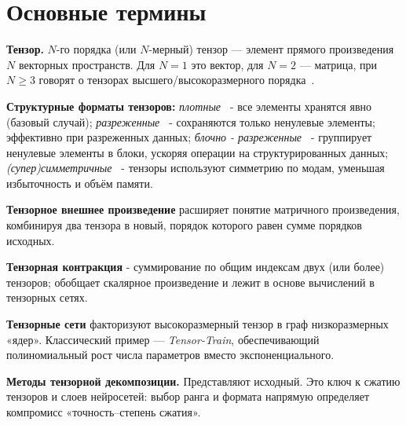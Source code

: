 \chapter{Основные термины}
\label{chap:preliminaries}

\textbf{Тензор.} $N$-го порядка (или $N$-мерный) тензор — элемент прямого произведения $N$ векторных пространств. Для $N{=}1$ это вектор, для $N{=}2$ — матрица, при $N\!\ge\!3$ говорят о тензорах высшего/высокоразмерного порядка~\cite{tensorly_parafac_tucker}.

\textbf{Структурные форматы тензоров:} \emph{плотные~\cite{tensor_calculus}} - все элементы хранятся явно (базовый случай); \emph{разреженные~\cite{sparse_matrices, sparse_tensor, sparse_and_block_sparse_tensors}} - сохраняются только ненулевые элементы; эффективно при разреженных данных; \emph{блочно - разреженные~\cite{sparse_and_block_sparse_tensors}} - группирует ненулевые элементы в блоки, ускоряя операции на структурированных данных; \emph{(супер)симметричные~\cite{tensor_calculus}} - тензоры используют симметрию по модам, уменьшая избыточность и объём памяти.

\textbf{Тензорное внешнее произведение} расширяет понятие матричного произведения, комбинируя два тензора в новый, порядок которого равен сумме порядков исходных.  

\textbf{Тензорная контракция} - суммирование по общим индексам двух (или более) тензоров; обобщает скалярное произведение и лежит в основе вычислений в тензорных сетях.  

\textbf{Тензорные сети} факторизуют высокоразмерный тензор в граф низкоразмерных «ядер». Классический пример — \emph{Tensor-Train}, обеспечивающий полиномиальный рост числа параметров вместо экспоненциального.  

\textbf{Методы тензорной декомпозиции.} Представляют исходный. Это ключ к сжатию тензоров и слоев нейросетей: выбор ранга и формата напрямую определяет компромисс «точность–степень сжатия».